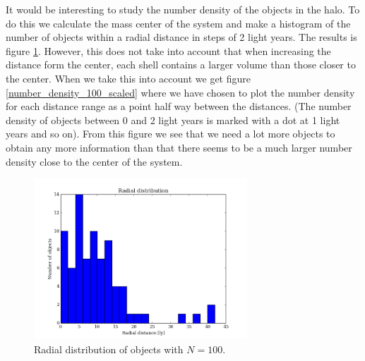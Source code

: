 \documentclass{aa}   %
\begin{document}
It would be interesting to study the number density of the objects in the halo.
To do this we calculate the mass center of the system and make a histogram of the number of objects within a radial distance in steps of 2 light years. The results is figure \ref{number_density_100}. However, this does not take into account that when increasing the distance form the center, each shell contains a larger volume than those closer to the center. When we take this into account we get figure \ref{number_density_100_scaled} where we have chosen to plot the number density for each distance range as a point half way between the distances. (The number density of objects between 0 and 2 light years is marked with a dot at 1 light years and so on). From this figure we see that we need a lot more objects to obtain any more information than that there seems to be a much larger number density close to the center of the system.
\begin{figure}[hbtp]
 \centering
 \includegraphics[width=80mm]{number_density_100.png}
 \caption[]{\label{number_density_100}
   Radial distribution of objects with $N=100$.
 }
\end{figure}
\end{document}
